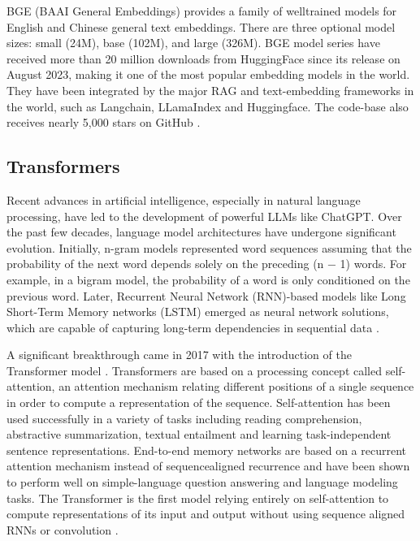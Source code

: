 BGE (BAAI General Embeddings) provides a family of welltrained models for English and Chinese general text embeddings. There are three optional model sizes: small (24M), base (102M), and large (326M). BGE model series have received more than 20 million downloads from HuggingFace since its release on August 2023, making it one of the most popular embedding models in the world. They have been integrated by the major RAG and text-embedding frameworks in the world, such as Langchain, LLamaIndex and Huggingface. The code-base also receives nearly 5,000 stars on GitHub \cite{Xiao.14Sep2023}.


\subsection{Transformers}
Recent advances in artificial intelligence, especially in natural language processing, have led to the development of powerful LLMs like ChatGPT. Over the past few decades, language model architectures have undergone significant evolution. Initially, n-gram models represented word sequences assuming that the probability of the next word depends solely on the preceding (n − 1) words. For example, in a bigram model, the probability of a word is only conditioned on the previous word. Later, Recurrent Neural Network (RNN)-based models like Long Short-Term Memory networks (LSTM) emerged as neural network solutions, which are capable of capturing long-term dependencies in sequential data \cite{.2023}.

A significant breakthrough came in 2017 with the introduction of the Transformer model \cite{Vaswani.12Jun2017}. Transformers are based on a processing concept called self-attention, an attention mechanism relating different positions of a single sequence in order to compute a representation of the sequence. Self-attention has been used successfully in a variety of tasks including reading comprehension, abstractive summarization, textual entailment and learning task-independent sentence representations. End-to-end memory networks are based on a recurrent attention mechanism instead of sequencealigned recurrence and have been shown to perform well on simple-language question answering and language modeling tasks. The Transformer is the first model relying entirely on self-attention to compute representations of its input and output without using sequence aligned RNNs or convolution \cite{AustinHuangSurajSubramanianJonathanSumKhalidAlmubarakandStellaBiderman..2022}.

